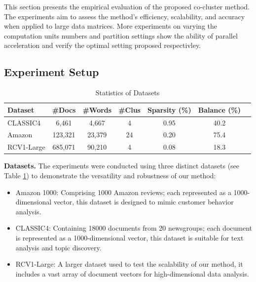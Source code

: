 \documentclass[journal]{IEEEtran}
\begin{document}
This section presents the empirical evaluation of the proposed co-cluster method. The experiments aim to assess the method's efficiency, scalability, and accuracy when applied to large data matrices. More experiments on varying the computation units numbers and partition settings show the ability of parallel acceleration and verify the optimal setting proposed respectivley.

\subsection{Experiment Setup}

\begin{table}[h]
  \centering
  \caption{Statistics of Datasets}
  \label{tab:dataset-statistics}
  \begin{tabular}{lccc@{}c@{}c@{}c}
    \hline
    \textbf{Dataset} & \textbf{\#Docs} & \textbf{\#Words} & \textbf{\#Clus} & \textbf{Sparsity (\%)} & \textbf{Balance (\%)} \\
    \hline
    CLASSIC4         & 6,461           & 4,667            & 4               & 0.95                   & 40.2                  \\
    Amazon           & 123,321         & 23,379           & 24              & 0.20                   & 75.4                  \\
    RCV1-Large       & 685,071         & 90,210           & 4               & 0.08                   & 18.3                  \\
    \hline
  \end{tabular}
\end{table}

\textbf{Datasets.}
The experiments were conducted using three distinct datasets (see Table \ref{tab:dataset-statistics}) to demonstrate the versatility and robustness of our method:

\begin{itemize}
  \item Amazon 1000: Comprising 1000 Amazon reviews; each represented as a 1000-dimensional vector, this dataset is designed to mimic customer behavior analysis.
  \item CLASSIC4: Containing 18000 documents from 20 newsgroups; each document is represented as a 1000-dimensional vector, this dataset is suitable for text analysis and topic discovery.
  \item RCV1-Large: A larger dataset used to test the scalability of our method, it includes a vast array of document vectors for high-dimensional data analysis.
\end{itemize}
\end{document}
